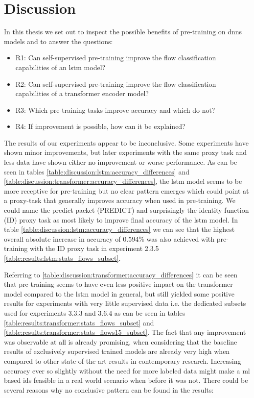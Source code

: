 \chapter{Discussion} \label{sec:discussion}

In this thesis we set out to inspect the possible benefits of pre-training on \glspl{dnn} models and to answer the questions:

\begin{itemize}
	\item R1: Can self-supervised pre-training improve the flow classification capabilities of an \gls{lstm} model?
	\item R2: Can self-supervised pre-training improve the flow classification capabilities of a transformer encoder model?
	\item R3: Which pre-training tasks improve accuracy and which do not?
	\item R4: If improvement is possible, how can it be explained?
\end{itemize}

The results of our experiments appear to be inconclusive. Some experiments have shown minor improvements, but later experiments with the same proxy task and less data have shown either no improvement or worse performance. As can be seen in tables \ref{table:discussion:lstm:accuracy_differences} and \ref{table:discussion:transformer:accuracy_differences}, the \gls{lstm} model seems to be more receptive for pre-training but no clear pattern emerges which could point at a proxy-task that generally improves accuracy when used in pre-training. We could name the predict packet (PREDICT) and surprisingly the identity function (ID) proxy task as most likely to improve final accuracy of the \gls{lstm} model. In table \ref{table:discussion:lstm:accuracy_differences} we can see that the highest overall absolute increase in accuracy of 0.594\% was also achieved with pre-training with the ID proxy task in experiment 2.3.5 \ref{table:results:lstm:stats_flows_subset}. \par
Referring to \ref{table:discussion:transformer:accuracy_differences} it can be seen that pre-training seems to have even less positive impact on the transformer model compared to the \gls{lstm} model in general, but still yielded some positive results for experiments with very little supervised data i.e. the dedicated subsets used for experiments 3.3.3 and 3.6.4 as can be seen in tables \ref{table:results:transformer:stats_flows_subset} and \ref{table:results:transformer:stats_flows15_subset}. The fact that any improvement was observable at all is already promising, when considering that the baseline results of exclusively supervised trained models are already very high when compared to other state-of-the-art results in contemporary research. Increasing accuracy ever so slightly without the need for more labeled data might make a \gls{ml} based \gls{ids} feasible in a real world scenario when before it was not. There could be several reasons why no conclusive pattern can be found in the results: \par

